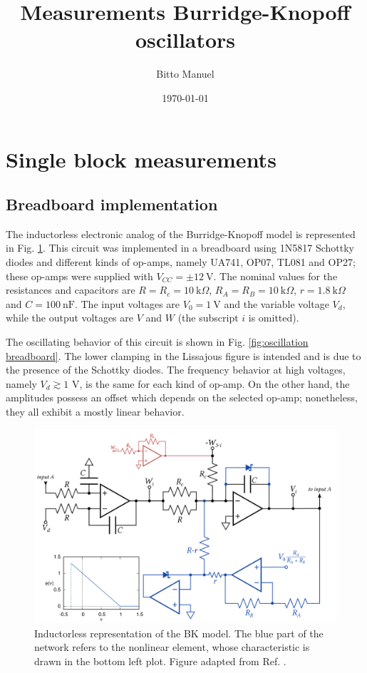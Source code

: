 \documentclass[a4paper,11pt,aps,secnumarabic,balancelastpage,amsmath,amssymb,floatfix,table]{article}
\begin{document}
\title{\bf{Measurements Burridge-Knopoff oscillators}}
\author{Bitto Manuel}
\date{\today}
\maketitle

\section{Single block measurements}

\subsection{Breadboard implementation}\label{sec:breadboard}

The inductorless electronic analog of the Burridge-Knopoff model
\cite{main_paper} is represented in Fig.
\ref{fig:breadboard implementation}. This circuit was implemented
in a breadboard using 1N5817 Schottky diodes and different kinds
of op-amps, namely UA741, OP07, TL081 and OP27; these op-amps were
supplied with $V_{CC}=\pm12~\text{V}$. The nominal values for the
resistances and capacitors are $R=R_c=10~\text{k}\Omega$,
$R_A=R_B=10~\text{k}\Omega$, $r=1.8~\text{k}\Omega$ and
$C=100~\text{nF}$. The input voltages are $V_0=1~\text{V}$ and
the variable voltage $V_d$, while the output voltages are
$V$ and $W$ (the subscript $i$ is omitted).

The oscillating behavior of this circuit is shown in Fig.
\ref{fig:oscillation breadboard}. The lower clamping in the Lissajous
figure is intended and is due to the presence of the Schottky diodes.
The frequency behavior at high voltages,
namely $V_d \gtrsim 1$ V, is the same for each kind of op-amp.
On the other hand, the amplitudes possess an offset which depends on
the selected op-amp; nonetheless, they all exhibit a mostly linear
behavior.

\begin{figure}[H]
    \centering
    \includegraphics[width=\linewidth]
    {../1_block/breadboard/breadboard_implementation.png}
    \caption{Inductorless representation of the BK model.
    The blue part of the network refers to the nonlinear element,
    whose characteristic is drawn in the bottom left plot.
    Figure adapted from Ref. \cite{main_paper}.}\label{fig:breadboard implementation}
\end{figure}
\end{document}
